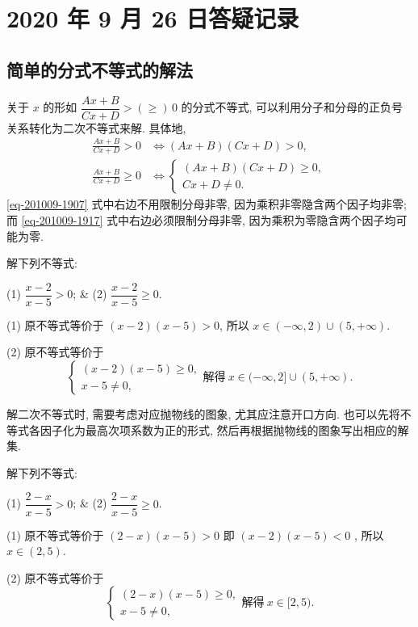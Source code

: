 \section{2020 年 9 月 26 日答疑记录}

\subsection{简单的分式不等式的解法}

关于 $x$ 的形如 $\dfrac{Ax+B}{Cx+D}>(\geqslant)\,0$ 的分式不等式, 可以利用分子和分母的正负号关系转化为二次不等式来解. 具体地,
\begin{align}\label{eq-201009-1907}
  \frac{Ax+B}{Cx+D}>0 & \Leftrightarrow (Ax+B)(Cx+D)>0,\\
  \label{eq-201009-1917}
  \frac{Ax+B}{Cx+D}\geqslant 0 & \Leftrightarrow \left\{\!\!
    \begin{array}{l}
      (Ax+B)(Cx+D)\geqslant 0,\\
      Cx+D\neq 0.
    \end{array}\right.
\end{align}
\eqref{eq-201009-1907} 式中右边不用限制分母非零, 因为乘积非零隐含两个因子均非零; 而 \eqref{eq-201009-1917} 式中右边必须限制分母非零, 因为乘积为零隐含两个因子均可能为零. 

\begin{example}
  解下列不等式:
  \begin{twocolpro}
    (1) $\dfrac{x-2}{x-5}>0$; & (2) $\dfrac{x-2}{x-5}\geqslant 0$.
  \end{twocolpro}
\end{example}
\begin{solution}
  (1) 原不等式等价于 $(x-2)(x-5)>0$, 所以 $x\in (-\infty,2)\cup (5,+\infty)$.
  
  (2) 原不等式等价于
  \[\left\{\!\!\begin{array}{l}
        (x-2)(x-5)\geqslant 0,\\
        x-5\neq 0,
      \end{array}\right. \text{解得}\ 
      x\in (-\infty,2]\cup (5,+\infty).\]
\end{solution}

解二次不等式时, 需要考虑对应抛物线的图象, 尤其应注意开口方向. 也可以先将不等式各因子化为最高次项系数为正的形式, 然后再根据抛物线的图象写出相应的解集.

\begin{example}
  解下列不等式:
  \begin{twocolpro}
    (1) $\dfrac{2-x}{x-5}>0$; & (2) $\dfrac{2-x}{x-5}\geqslant 0$.
  \end{twocolpro}
\end{example}
\begin{solution}
  (1) 原不等式等价于 $(2-x)(x-5)>0$ 即 $(x-2)(x-5)<0$ , 所以 $x\in (2,5)$.
  
  (2) 原不等式等价于
  \[\left\{\!\!\begin{array}{l}
        (2-x)(x-5)\geqslant 0,\\
        x-5\neq 0,
      \end{array}\right. \text{解得}\ 
      x\in [2,5).\]
\end{solution}

